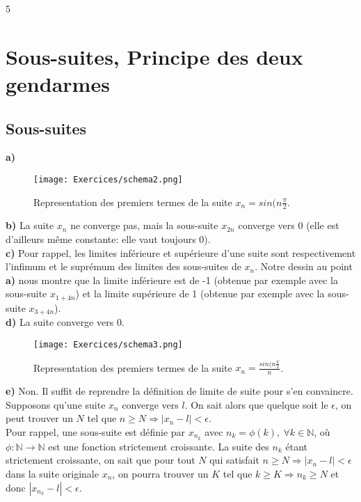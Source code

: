 5\documentclass[a4paper, 12pt, french, twoside]{article}
\newcommand{\Nn}{{\mathbb{N}}}
\begin{document}
\section{Sous-suites, Principe des deux gendarmes}

\subsection{Sous-suites}

\textbf{a)} \\

\begin{figure}[H]
    \centering
    \texttt{[image: Exercices/schema2.png]}
    \caption{Representation des premiers termes de la suite $x_n=sin(n\frac{\pi}{2}$.}
    \label{fig:enter-label}
\end{figure}

\textbf{b)} La suite $x_n$ ne converge pas, mais la sous-suite $x_{2n}$ converge vers 0 (elle est d'ailleurs même constante: elle vaut toujours 0).\\

\textbf{c)} Pour rappel, les limites inférieure et supérieure d'une suite sont respectivement l'infimum et le suprémum des limites des sous-suites de $x_n$. Notre dessin au point \textbf{a)} nous montre que la limite inférieure est de -1 (obtenue par exemple avec la sous-suite $x_{1+4n}$) et la limite supérieure de 1 (obtenue par exemple avec la sous-suite $x_{3+4n}$). \\

\textbf{d)} La suite converge vers 0. \\


\begin{figure}[H]
    \centering
    \texttt{[image: Exercices/schema3.png]}
    \caption{Representation des premiers termes de la suite $x_n=\frac{sin(n\frac{\pi}{2}}{n}$.}
    \label{fig:enter-label}
\end{figure}

\textbf{e)} Non. Il suffit de reprendre la définition de limite de suite pour s'en convaincre. Supposons qu'une suite $x_n$ converge vers $l$. On sait alors que quelque soit le $\epsilon$, on peut trouver un $N$ tel que $n \geq N \Rightarrow |x_n - l| < \epsilon$. \\
Pour rappel, une sous-suite est définie par $x_{n_k}$ avec $n_k = \phi(k), \ \forall k \in \Nn$, où $\phi: \Nn \rightarrow \Nn$ est une fonction strictement croissante. La suite des $n_k$ étant strictement croissante, on sait que pour tout $N$ qui satisfait $n \geq N \Rightarrow |x_n - l| < \epsilon$ dans la suite originale $x_n$, on pourra trouver un $K$ tel que $k \geq K \Rightarrow n_k \geq N$ et donc $|x_{n_k} - l| < \epsilon$.
\end{document}
